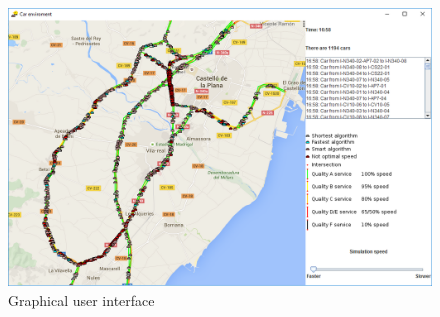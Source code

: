\begin{figure}[!ht]
  \centering
  \includegraphics[scale=0.5]{images/gui.png} 
  \caption{Graphical user interface}
  \label{gui}
\end{figure}

























